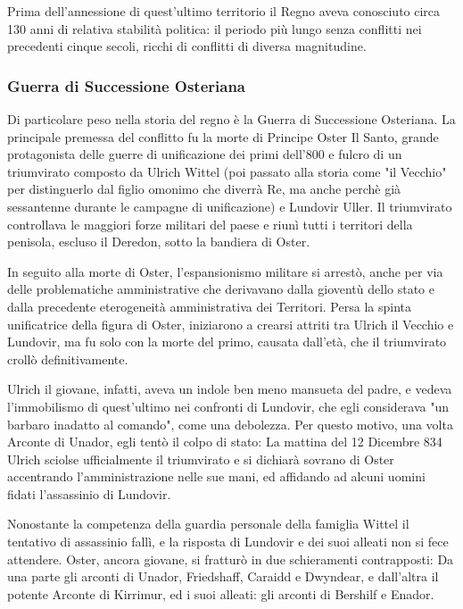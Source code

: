 Prima dell'annessione di quest'ultimo territorio il Regno aveva conosciuto circa 130 anni di relativa stabilità politica: il periodo più lungo senza conflitti nei precedenti cinque secoli, ricchi di conflitti di diversa magnitudine.

\subsubsection{Guerra di Successione Osteriana} %
Di particolare peso nella storia del regno è la Guerra di Successione Osteriana. La principale premessa del conflitto fu la morte di Principe Oster Il Santo, grande protagonista delle guerre di unificazione dei primi dell'800 e fulcro di un triumvirato composto da Ulrich Wittel (poi passato alla storia come "il Vecchio" per distinguerlo dal figlio omonimo che diverrà Re, ma anche perchè già sessantenne durante le campagne di unificazione) e Lundovir Uller. Il triumvirato controllava le maggiori forze militari del paese e riunì tutti i territori della penisola, escluso il Deredon, sotto la bandiera di Oster.

In seguito alla morte di Oster, l'espansionismo militare si arrestò, anche per via delle problematiche amministrative che derivavano dalla gioventù dello stato e dalla precedente eterogeneità amministrativa dei Territori. Persa la spinta unificatrice della figura di Oster, iniziarono a crearsi attriti tra Ulrich il Vecchio e Lundovir, ma fu solo con la morte del primo, causata dall'età, che il triumvirato crollò definitivamente.

Ulrich il giovane, infatti, aveva un indole ben meno mansueta del padre, e vedeva l'immobilismo di quest'ultimo nei confronti di Lundovir, che egli considerava "un barbaro inadatto al comando", come una debolezza. Per questo motivo, una volta Arconte di Unador, egli tentò il colpo di stato: La mattina del 12 Dicembre 834 Ulrich sciolse ufficialmente il triumvirato e si dichiarà sovrano di Oster accentrando l'amministrazione nelle sue mani, ed affidando ad alcuni uomini fidati l'assassinio di Lundovir.

Nonostante la competenza della guardia personale della famiglia Wittel il tentativo di assassinio fallì, e la risposta di Lundovir e dei suoi alleati non si fece attendere. Oster, ancora giovane, si fratturò in due schieramenti contrapposti: Da una parte gli arconti di Unador, Friedshaff, Caraidd e Dwyndear, e dall'altra il potente Arconte di Kirrimur, ed i suoi alleati: gli arconti di Bershilf e Enador.


